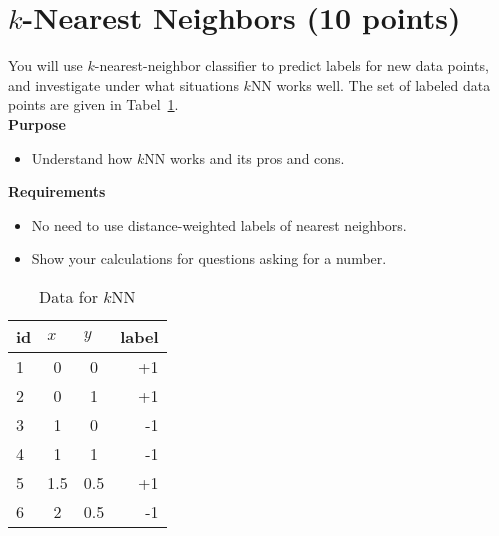 \section{$k$-Nearest Neighbors (10 points)}
You will use $k$-nearest-neighbor classifier to predict labels for new data points, and investigate under what situations $k$NN works well. The set of labeled data points are given in Tabel~\ref{tab:knn}.\\

\textbf{Purpose} 
\begin{itemize}
	\item Understand how $k$NN works and its pros and cons.
\end{itemize}

\textbf{Requirements}
\begin{itemize}
	
	\item No need to use distance-weighted labels of nearest neighbors.
	\item Show your calculations for questions asking for a number.
\end{itemize}


\begin{table}[ht]
	\centering
	\begin{tabular}{l|cc|r}
		\textbf{id} & \multicolumn{1}{l}{$x$} & \multicolumn{1}{l|}{$y$} & \multicolumn{1}{l}{\textbf{label}} \\ \hline
		1           & 0                       & 0                        & +1                                 \\
		2           & 0                       & 1                        & +1                                 \\
		3           & 1                       & 0                        & -1                                 \\
		4           & 1                       & 1                        & -1                                 \\
		5           & 1.5                     & 0.5                      & +1                                 \\
		6           & 2                       & 0.5                      & -1                                
	\end{tabular}
	\caption{Data for $k$NN}
	\label{tab:knn}	
\end{table}


